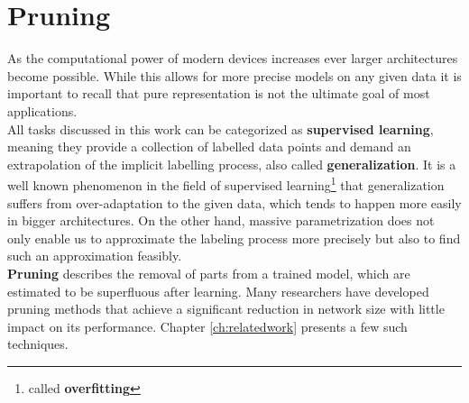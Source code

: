 \section{Pruning}
As the computational power of modern devices increases ever larger architectures become possible. While this allows for more precise models on any given data it is important to recall that pure representation is not the ultimate goal of most applications.\\
All tasks discussed in this work can be categorized as \textbf{supervised learning}, meaning they provide a collection of labelled data points and demand an extrapolation of the implicit labelling process, also called \textbf{generalization}.
It is a well known phenomenon in the field of supervised learning\footnote{called \textbf{overfitting}} that generalization suffers from over-adaptation to the given data, which tends to happen more easily in bigger architectures. On the other hand, massive parametrization does not only enable us to approximate the labeling process more precisely but also to find such an approximation feasibly.\cite{Overparametrization}\\
\textbf{Pruning} describes the removal of parts from a trained model, which are estimated to be superfluous after learning. Many researchers have developed pruning methods that achieve a significant reduction in network size with little impact on its performance. Chapter \ref{ch:relatedwork} presents a few such techniques.

